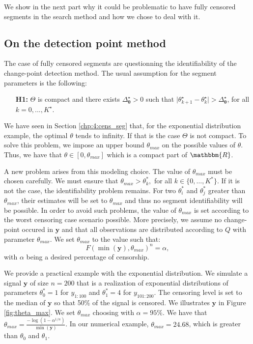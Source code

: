We show in the next part why it could be problematic to have fully censored segments in the search method and how we chose to deal with it. 

\subsection{On the detection point method}

The case of fully censored segments are questionning the identifiability of the change-point detection method. The usual assumption \citep{Lavielle1997} for the segment parameters is the following:   
\begin{itemize}
\item[\textbf{H1:}] $\Theta$ is compact and there exists $\Delta_{\bm \theta}^{\star}>0$ such that $\vert \theta_{k+1}^{\star}-\theta_{k}^{\star}\vert > \Delta_{\bm \theta}^{\star}$, for all $k=0,...,K^{\star}$. 
\end{itemize}

We have seen in Section \ref{chp:4:cens_seg} that, for the exponential distribution example, the optimal $\theta$ tends to infinity. If that is the case $\Theta$ is not compact. To solve this problem, we impose an upper bound $\theta_{max}$ on the possible values of $\theta$. Thus, we have that $\theta \in [0,\theta_{max}]$ which is a compact part of $\mathbbm{R}$. 

A new problem arises from this modeling choice. The value of $\theta_{max}$ must be chosen carefully. We must ensure that $\theta_{max}> \theta^*_k,$ for all $k \in \{0,\dots,K^*\}$. If it is not the case, the identifiability problem remains. For two $\theta^*_i$ and $\theta^*_j$    greater than $\theta_{max}$, their estimates will be set to $\theta_{max}$ and thus no segment identifiability will be possible. In order to avoid such problems, the value of $\theta_{max}$ is set according to the worst censoring case scenario possible. More precisely, we assume no change-point occured in $\bm y$ and that all observations are distributed according to $Q$ with parameter $\theta_{max}$. We set $\theta_{max}$ to the value such that: 
$$F(\min(\bm y),\theta_{max})^n = \alpha,$$
with $\alpha$ being a desired percentage of censorship. 

We provide a practical example with the exponential distribution. We simulate a signal $\bm y$ of size $n = 200$ that is a realization of exponential distributions of parameters $\theta^*_0 = 1$ for $y_{1:100}$ and $\theta^*_1 = 4$ for $y_{101:200}$. The censoring level is set to the median of $\bm y$ so that 50$\%$ of the signal is censored. We illustrates $\bm y$ in Figure \ref{fig:theta_max}. We set $\theta_{max}$ choosing with $\alpha = 95\%$. We have that $\theta_{max} = \frac{-\log(1-\alpha^{1/n})}{\min(\bm y)}$. In our numerical example, $\theta_{max} = 24.68$, which is greater than $\theta_0$ and $\theta_1$.


